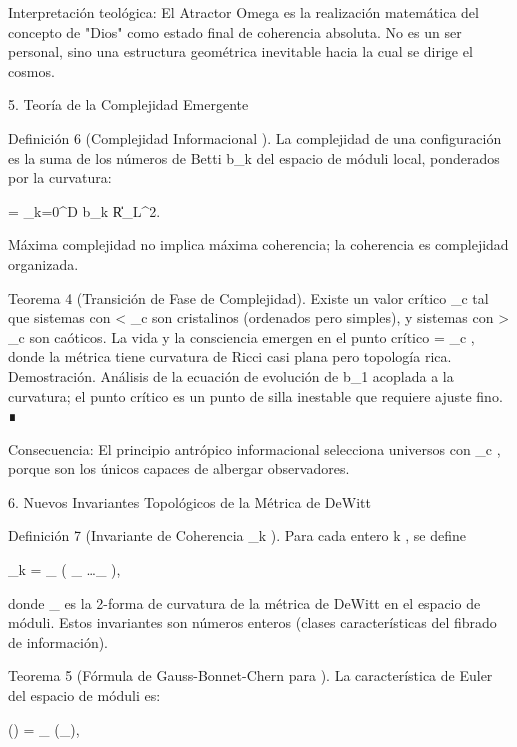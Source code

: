 \documentclass[12pt,a4paper]{book}
\begin{document}
Interpretación teológica: El Atractor Omega es la realización matemática del concepto de "Dios" como estado final de coherencia absoluta. No es un ser personal, sino una estructura geométrica inevitable hacia la cual se dirige el cosmos.

5. Teoría de la Complejidad Emergente

Definición 6 (Complejidad Informacional   ). La complejidad de una configuración  \rho  es la suma de los números de Betti  b_k  del espacio de móduli local, ponderados por la curvatura:

 = \sum_{k=0}^{D} b_k \cdot \|R\|_{L^2}.

Máxima complejidad no implica máxima coherencia; la coherencia es complejidad organizada.

Teorema 4 (Transición de Fase de Complejidad). Existe un valor crítico  _c  tal que sistemas con   < _c  son cristalinos (ordenados pero simples), y sistemas con   > _c  son caóticos. La vida y la consciencia emergen en el punto crítico   = _c , donde la métrica tiene curvatura de Ricci casi plana pero topología rica.
Demostración. Análisis de la ecuación de evolución de  b_1  acoplada a la curvatura; el punto crítico es un punto de silla inestable que requiere ajuste fino. ∎

Consecuencia: El principio antrópico informacional selecciona universos con   \approx {}_c , porque son los únicos capaces de albergar observadores.

6. Nuevos Invariantes Topológicos de la Métrica de DeWitt

Definición 7 (Invariante de Coherencia  _k ). Para cada entero  k , se define

_k = \int_{}  \left( _{} \wedge \dots \wedge {}_{} \right),

donde  _{}  es la 2-forma de curvatura de la métrica de DeWitt    en el espacio de móduli. Estos invariantes son números enteros (clases características del fibrado de información).

Teorema 5 (Fórmula de Gauss-Bonnet-Chern para   ). La característica de Euler del espacio de móduli    es:

\chi() =  \int_{} (_{}),
\end{document}
